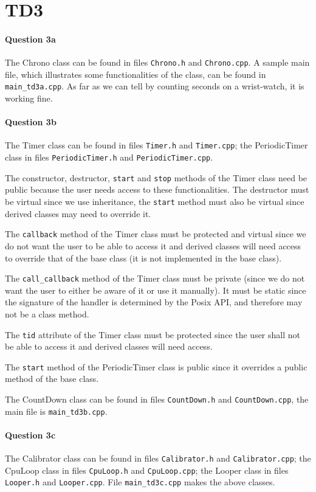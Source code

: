 \documentclass[a4paper,oneside,11pt]{article}
\begin{document}
\section*{TD3}
\paragraph{Question 3a} The Chrono class can be found in files \texttt{Chrono.h} and \texttt{Chrono.cpp}. A sample main file, which illustrates some functionalities of the class, can be found in \texttt{main\_td3a.cpp}. As far as we can tell by counting seconds on a wrist-watch, it is working fine.

\paragraph{Question 3b} The Timer class can be found in files \texttt{Timer.h} and \texttt{Timer.cpp}; the PeriodicTimer class in files \texttt{PeriodicTimer.h} and \texttt{PeriodicTimer.cpp}.

The constructor, destructor, \texttt{start} and \texttt{stop} methods of the Timer class need be public because the user needs access to these functionalities. The destructor must be virtual since we use inheritance, the \texttt{start} method must also be virtual since derived classes may need to override it.

The \texttt{callback} method of the Timer class must be protected and virtual since we do not want the user to be able to access it and derived classes will need access to override that of the base class (it is not implemented in the base class).

The \texttt{call\_callback} method of the Timer class must be private (since we do not want the user to either be aware of it or use it manually). It must be static since the signature of the handler is determined by the Posix API, and therefore may not be a class method.

The \texttt{tid} attribute of the Timer class must be protected since the user shall not be able to access it and derived classes will need access.

The \texttt{start} method of the PeriodicTimer class is public since it overrides a public method of the base class.

The CountDown class can be found in files \texttt{CountDown.h} and \texttt{CountDown.cpp}, the main file is \texttt{main\_td3b.cpp}.

\paragraph{Question 3c} The Calibrator class can be found in files \texttt{Calibrator.h} and \texttt{Calibrator.cpp}; the CpuLoop class in files \texttt{CpuLoop.h} and \texttt{CpuLoop.cpp}; the Looper class in files \texttt{Looper.h} and \texttt{Looper.cpp}. File \texttt{main\_td3c.cpp} makes the above classes.
\end{document}

